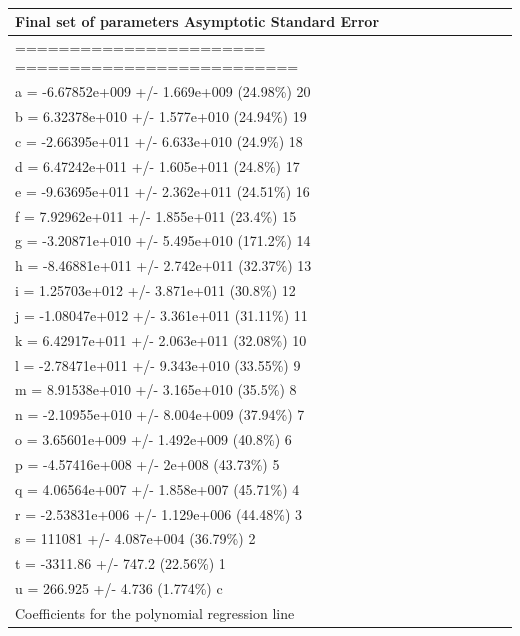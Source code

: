 \documentclass{article}
\begin{document}
\begin{table}[]
\centering
\caption{}
\label{nathantable1}
\begin{tabular}{@{}l@{}}
\toprule
Final set of parameters            Asymptotic Standard Error     \\ \midrule
=======================            ==========================    \\
a               = -6.67852e+009    +/- 1.669e+009   (24.98\%) 20 \\
b               = 6.32378e+010     +/- 1.577e+010   (24.94\%) 19 \\
c               = -2.66395e+011    +/- 6.633e+010   (24.9\%) 18  \\
d               = 6.47242e+011     +/- 1.605e+011   (24.8\%) 17  \\
e               = -9.63695e+011    +/- 2.362e+011   (24.51\%) 16 \\
f               = 7.92962e+011     +/- 1.855e+011   (23.4\%) 15  \\
g               = -3.20871e+010    +/- 5.495e+010   (171.2\%) 14 \\
h               = -8.46881e+011    +/- 2.742e+011   (32.37\%) 13 \\
i               = 1.25703e+012     +/- 3.871e+011   (30.8\%) 12  \\
j               = -1.08047e+012    +/- 3.361e+011   (31.11\%) 11 \\
k               = 6.42917e+011     +/- 2.063e+011   (32.08\%) 10 \\
l               = -2.78471e+011    +/- 9.343e+010   (33.55\%) 9  \\
m               = 8.91538e+010     +/- 3.165e+010   (35.5\%) 8   \\
n               = -2.10955e+010    +/- 8.004e+009   (37.94\%) 7  \\
o               = 3.65601e+009     +/- 1.492e+009   (40.8\%) 6   \\
p               = -4.57416e+008    +/- 2e+008       (43.73\%) 5  \\
q               = 4.06564e+007     +/- 1.858e+007   (45.71\%) 4  \\
r               = -2.53831e+006    +/- 1.129e+006   (44.48\%) 3  \\
s               = 111081           +/- 4.087e+004   (36.79\%) 2  \\
t               = -3311.86         +/- 747.2        (22.56\%) 1  \\
u               = 266.925          +/- 4.736        (1.774\%) c  \\
Coefficients for the polynomial regression line                  \\ \bottomrule
\end{tabular}
\end{table}
\end{document}
